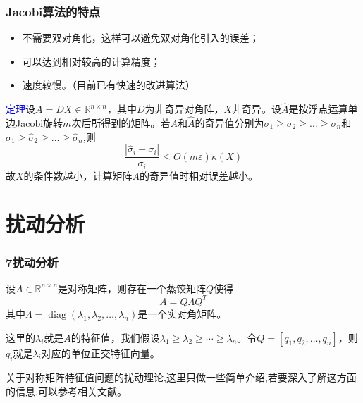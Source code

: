 \documentclass[notheorems,serif]{beamer}
\begin{document}
\begin{frame}
\frametitle{Jacobi算法的特点}

\begin{itemize}
	\item 不需要双对角化，这样可以避免双对角化引入的误差；
	\item 可以达到相对较高的计算精度；
	\item 速度较慢。（目前已有快速的改进算法）
\end{itemize}

\textcolor{blue}{定理}\quad 设$A=DX\in \mathbb {R}^{n\times n}$，其中$D$为非奇异对角阵，$X$非奇异。设$\hat {A}$是按浮点运算单边Jacobi旋转$m$次后所得到的矩阵。若$A$和$\hat {A}$的奇异值分别为$\sigma_{1} \geq \sigma_{2} \geq \ldots \geq \sigma_{n}$和$\hat{\sigma}_{1} \geq \hat{\sigma}_{2} \geq \ldots \geq \hat{\sigma}_{n}$,则$$
\frac{\left|\hat{\sigma}_{i}-\sigma_{i}\right|}{\sigma_{i}} \leq O(m \varepsilon) \kappa(X)
$$
故$X$的条件数越小，计算矩阵$A$的奇异值时相对误差越小。

\end{frame}
\section{扰动分析}
\begin{frame}
\frametitle{7\qquad 扰动分析}


设$A\in \mathbb{R}^{n\times n}$是对称矩阵，则存在一个蒸饺矩阵$Q$使得$$A=Q\Lambda Q^T$$
其中$\Lambda=\operatorname{diag}\left(\lambda_{1}, \lambda_{2}, \dots, \lambda_{n}\right)$是一个实对角矩阵。

这里的$\lambda_{i}$就是$A$的特征值，我们假设$\lambda_{1} \geq \lambda_{2} \geq \cdots \geq \lambda_{n}$。令$Q=\left[q_{1}, q_{2}, \ldots, q_{n}\right]$，则$q_i$就是$\lambda_{i}$对应的单位正交特征向量。

关于对称矩阵特征值问题的扰动理论,这里只做一些简单介绍,若要深入了解这方面的信息,可以参考相关文献。
\end{frame}
\end{document}
